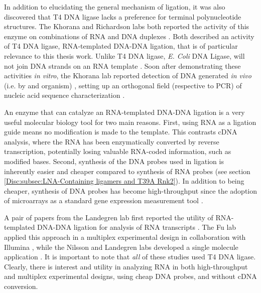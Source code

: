     In addition to elucidating the general mechanism of ligation, it was also discovered that T4 DNA ligase lacks a preference for terminal polynucleotide structures. The Khorana and Richardson labs both reported the activity of this enzyme on combinations of RNA and DNA duplexes \citep{Fareed1971, Kleppe1970b}. Both described an activity of T4 DNA ligase, RNA-templated DNA-DNA ligation, that is of particular relevance to this thesis work. Unlike T4 DNA ligase, \textit{E. Coli} DNA Ligase, will not join DNA strands on an RNA template \citep{Bullard2006}. Soon after demonstrating these activities \textit{in vitro}, the Khorana lab reported detection of DNA generated \textit{in vivo} (i.e. by and organism) \citep{Besmer1972b}, setting up an orthogonal field (respective to PCR) of nucleic acid sequence characterization \citep{Conze2009c}.

    An enzyme that can catalyze an RNA-templated DNA-DNA ligation is a very useful molecular biology tool for two main reasons. First, using RNA as a ligation guide means no modification is made to the template. This contrasts cDNA analysis, where the RNA has been enzymatically converted by reverse transcription, potentially losing valuable RNA-coded information, such as modified bases. Second, synthesis of the DNA probes used in ligation is inherently easier and cheaper compared to synthesis of RNA probes (see section \ref{Disc:subsec:LNA-Containing ligamers and T39A Rnk2}). In addition to being cheaper, synthesis of DNA probes has become high-throughput since the adoption of microarrays as a standard gene expression measurement tool \citep{Schena1995a}. 

    A pair of papers from the Landegren lab first reported the utility of RNA-templated DNA-DNA ligation for analysis of RNA transcripts \citep{Nilsson2000,Nilsson2001}. The Fu lab applied this approach in a multiplex experimental design in collaboration with Illumina \citep{Li2012c,Yeakley2002}, while the Nilsson and Landegren labs developed a single molecule application \citep{Conze2010}. It is important to note that \textit{all} of these studies used T4 DNA ligase. Clearly, there is interest and utility in analyzing RNA in both high-throughput and multiplex experimental designs, using cheap DNA probes, and without cDNA conversion.

